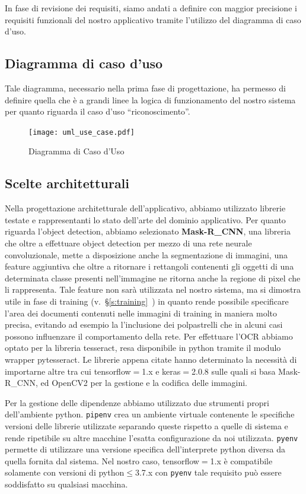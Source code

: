 \documentclass[12pt,a4paper]{article}
\newcommand{\mrcnn}{Mask-R\_CNN}
\begin{document}
In fase di revisione dei requisiti, siamo andati a definire con maggior
precisione i requisiti funzionali del nostro applicativo tramite
l'utilizzo del diagramma di caso d'uso.

\subsection{Diagramma di caso d'uso}

Tale diagramma, necessario nella prima fase di progettazione, ha
permesso di definire quella che è a grandi linee la logica di
funzionamento del nostro
sistema per quanto riguarda il caso d'uso ``riconoscimento''.

\begin{figure}[H]
    \caption{Diagramma di Caso d'Uso}
    \centering
    \texttt{[image: uml\_use\_case.pdf]}
\end{figure}

\subsection{Scelte architetturali}

Nella progettazione architetturale dell'applicativo, abbiamo utilizzato
librerie testate e rappresentanti lo stato dell'arte del dominio
applicativo. Per quanto riguarda l'object detection, abbiamo selezionato
\textbf{\mrcnn}, una libreria che oltre a effettuare object detection
per mezzo di una rete neurale convoluzionale, mette a disposizione anche
la segmentazione di immagini, una feature aggiuntiva che oltre a
ritornare i rettangoli contenenti gli oggetti di una determinata classe
presenti nell'immagine ne ritorna anche la regione di pixel che li
rappresenta. Tale feature non sarà utilizzata nel nostro sistema, ma si
dimostra utile in fase di training
(v.~§\ref{s:training}~) in quanto rende possibile
specificare l'area dei documenti contenuti nelle immagini di training in
maniera molto precisa, evitando ad esempio la l'inclusione dei
polpastrelli che in alcuni casi possono influenzare il comportamento
della rete. Per effettuare l'OCR abbiamo optato per la libreria
tesseract, resa disponibile in python tramite il modulo wrapper
pytesseract. Le librerie appena citate hanno determinato la necessità di
importarne altre tra cui tensorflow$=$1.x e keras$=$2.0.8 sulle quali si
basa \mrcnn, ed OpenCV2 per la gestione e la codifica delle immagini.

Per la gestione delle dipendenze abbiamo utilizzato due strumenti propri
dell'ambiente python. \texttt{pipenv} crea un ambiente virtuale
contenente le specifiche versioni delle librerie utilizzate separando
queste rispetto a quelle di sistema e rende ripetibile su altre macchine
l'esatta configurazione da noi utilizzata. \texttt{pyenv} permette di
utilizzare una versione specifica dell'interprete python diversa da
quella fornita dal sistema. Nel nostro caso, tensorflow$=$1.x è
compatibile solamente con versioni di python$\leq$3.7.x con
\texttt{pyenv} tale requisito può essere soddisfatto su qualsiasi
macchina.
\end{document}
